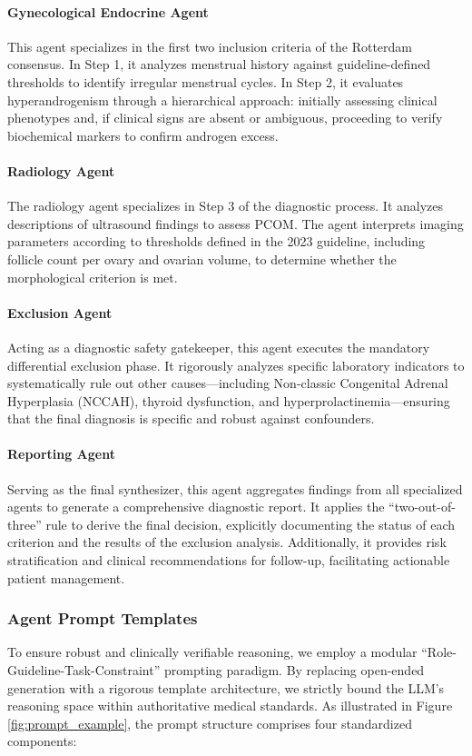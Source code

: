 \documentclass[a4paper,fleqn]{cas-dc}
\begin{document}
\paragraph{Gynecological Endocrine Agent} This agent specializes in the first two inclusion criteria of the Rotterdam consensus. In Step 1, it analyzes menstrual history against guideline-defined thresholds to identify irregular menstrual cycles. In Step 2, it evaluates hyperandrogenism through a hierarchical approach: initially assessing clinical phenotypes and, if clinical signs are absent or ambiguous, proceeding to verify biochemical markers to confirm androgen excess.

\paragraph{Radiology Agent} The radiology agent specializes in Step 3 of the diagnostic process. It analyzes descriptions of ultrasound findings to assess PCOM. The agent interprets imaging parameters according to thresholds defined in the 2023 guideline, including follicle count per ovary and ovarian volume, to determine whether the morphological criterion is met.

\paragraph{Exclusion Agent} Acting as a diagnostic safety gatekeeper, this agent executes the mandatory differential exclusion phase. It rigorously analyzes specific laboratory indicators to systematically rule out other causes—including Non-classic Congenital Adrenal Hyperplasia (NCCAH), thyroid dysfunction, and hyperprolactinemia—ensuring that the final diagnosis is specific and robust against confounders.

\paragraph{Reporting Agent} Serving as the final synthesizer, this agent aggregates findings from all specialized agents to generate a comprehensive diagnostic report. It applies the ``two-out-of-three'' rule to derive the final decision, explicitly documenting the status of each criterion and the results of the exclusion analysis. Additionally, it provides risk stratification and clinical recommendations for follow-up, facilitating actionable patient management.

\subsubsection{Agent Prompt Templates}
To ensure robust and clinically verifiable reasoning, we employ a modular ``Role-Guideline-Task-Constraint'' prompting paradigm. By replacing open-ended generation with a rigorous template architecture, we strictly bound the LLM's reasoning space within authoritative medical standards. As illustrated in Figure \ref{fig:prompt_example}, the prompt structure comprises four standardized components:
\end{document}
